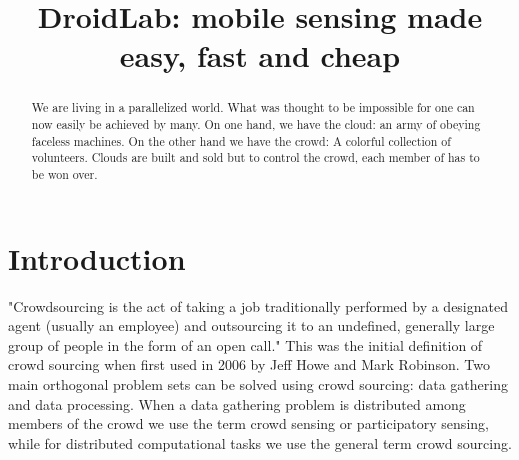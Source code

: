 \documentclass[conference,letterpaper]{IEEEtran}
\begin{document}

\title{DroidLab: mobile sensing made easy, fast and cheap}
\author{
  }




\maketitle


\begin{abstract}
We are living in a parallelized world. What was thought to be impossible for one can now easily be achieved by many. On one hand, we have the cloud: an army of obeying faceless machines. On the other hand we have the crowd: A colorful collection of volunteers. Clouds are built and sold but to control the crowd, each member of has to be won over.
\end{abstract}

\begin{IEEEkeywords}
\end{IEEEkeywords}
 
\section{Introduction}
\label{sec:intro}
"Crowdsourcing is the act of taking a job traditionally performed by a designated agent (usually an employee) and outsourcing it to an undefined, generally large group of people in the form of an open call." This was the initial definition of crowd sourcing when first used in 2006  by Jeff Howe and Mark Robinson. Two main orthogonal problem sets can be solved using crowd sourcing: data gathering and data processing. When a data gathering problem is distributed among members of the crowd we use the term crowd sensing or participatory sensing, while for distributed computational tasks we use the general term crowd sourcing.
\end{document}

